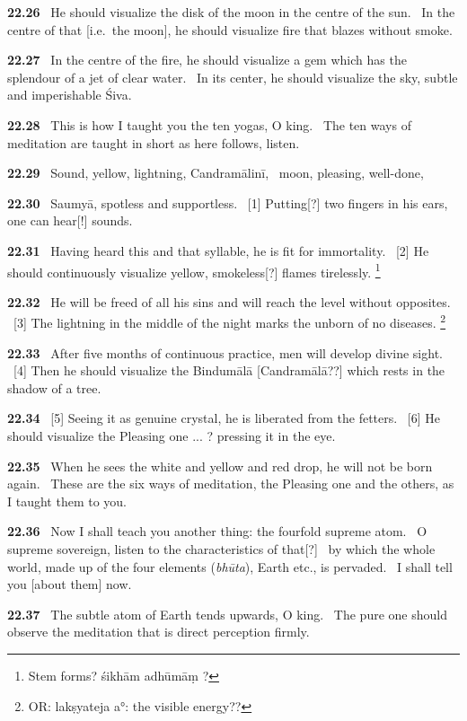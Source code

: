 \documentclass{article}
\newcommand{\skt}[1]{\textit{#1}}
\begin{document}
\textbf{22.26}%
\ He should visualize the disk of the moon in the centre of the sun.%
\ In the centre of that [i.e.\ the moon], he should visualize fire that blazes without smoke.%


\textbf{22.27}%
\ In the centre of the fire, he should visualize a gem which has the splendour of a jet of clear water.%
\ In its center, he should visualize the sky, subtle and imperishable Śiva.%


\textbf{22.28}%
\ This is how I taught you the ten yogas, O king.%
\ The ten ways of meditation are taught in short as here follows, listen.%


\textbf{22.29}%
\ Sound, yellow, lightning, Candramālinī,%
\ moon, pleasing, well-done,%


\textbf{22.30}%
\ Saumyā, spotless and supportless.%
\ [1] Putting[?] two fingers in his ears, one can hear[!] sounds.%


\textbf{22.31}%
\ Having heard this and that syllable, he is fit for immortality.%
\ [2] He should continuously visualize yellow, smokeless[?] flames tirelessly.%
\footnote{Stem forms? śikhām adhūmāṃ ? }%


\textbf{22.32}%
\ He will be freed of all his sins and will reach the level without opposites.%
\ [3] The lightning in the middle of the night marks the unborn of no diseases.%
\footnote{OR: lakṣyateja a°: the visible energy?? }%


\textbf{22.33}%
\ After five months of continuous practice, men will develop divine sight.%
\ [4] Then he should visualize the Bindumālā [Candramālā??] which rests in the shadow of a tree.%


\textbf{22.34}%
\ [5] Seeing it as genuine crystal, he is liberated from the fetters.%
\ [6] He should visualize the Pleasing one ... ? pressing it in the eye.%


\textbf{22.35}%
\ When he sees the white and yellow and red drop, he will not be born again.%
\ These are the six ways of meditation, the Pleasing one and the others, as I taught them to you.%


\textbf{22.36}%
\ Now I shall teach you another thing: the fourfold supreme atom.%
\                  O supreme sovereign, listen to the characteristics of that[?]%
\                  by which the whole world, made up of the four elements (\skt{bhūta}), Earth etc., is pervaded.%
\                  I shall tell you [about them] now.%


\textbf{22.37}%
\ The subtle atom of Earth tends upwards, O king.%
\                 The pure one should observe the meditation that is direct perception firmly.%
\end{document}
